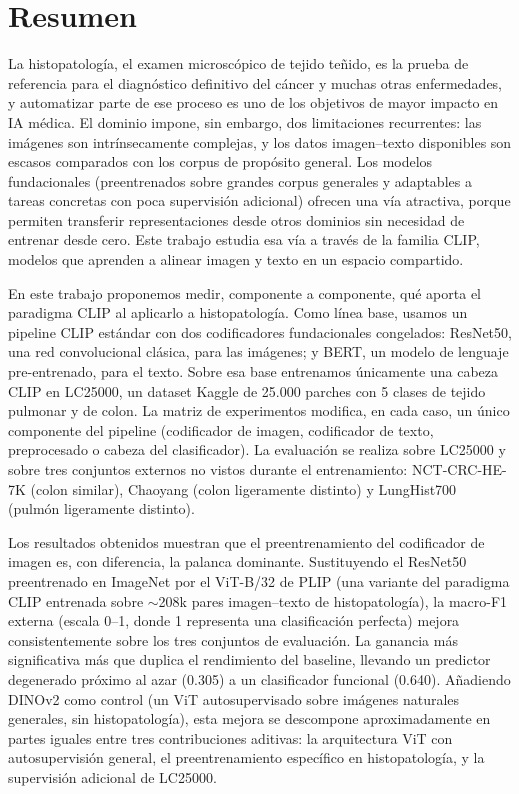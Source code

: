 
\chapter*{Resumen}
\pagestyle{especial}
{}

La histopatología, el examen microscópico de tejido teñido, es la prueba de referencia para el diagnóstico definitivo del cáncer y muchas otras enfermedades, y automatizar parte de ese proceso es uno de los objetivos de mayor impacto en IA médica. El dominio impone, sin embargo, dos limitaciones recurrentes: las imágenes son intrínsecamente complejas, y los datos imagen--texto disponibles son escasos comparados con los corpus de propósito general. Los modelos fundacionales (preentrenados sobre grandes corpus generales y adaptables a tareas concretas con poca supervisión adicional) ofrecen una vía atractiva, porque permiten transferir representaciones desde otros dominios sin necesidad de entrenar desde cero. Este trabajo estudia esa vía a través de la familia CLIP, modelos que aprenden a alinear imagen y texto en un espacio compartido.

En este trabajo proponemos medir, componente a componente, qué aporta el paradigma CLIP al aplicarlo a histopatología. Como línea base, usamos un pipeline CLIP estándar con dos codificadores fundacionales congelados: ResNet50, una red convolucional clásica, para las imágenes; y BERT, un modelo de lenguaje pre-entrenado, para el texto. Sobre esa base entrenamos únicamente una cabeza CLIP en LC25000, un dataset Kaggle de 25.000 parches con 5 clases de tejido pulmonar y de colon. La matriz de experimentos modifica, en cada caso, un único componente del pipeline (codificador de imagen, codificador de texto, preprocesado o cabeza del clasificador). La evaluación se realiza sobre LC25000 y sobre tres conjuntos externos no vistos durante el entrenamiento: NCT-CRC-HE-7K (colon similar), Chaoyang (colon ligeramente distinto) y LungHist700 (pulmón ligeramente distinto).

Los resultados obtenidos muestran que el preentrenamiento del codificador de imagen es, con diferencia, la palanca dominante. Sustituyendo el ResNet50 preentrenado en ImageNet por el ViT-B/32 de PLIP (una variante del paradigma CLIP entrenada sobre $\sim$208k pares imagen--texto de histopatología), la macro-F1 externa (escala 0--1, donde 1 representa una clasificación perfecta) mejora consistentemente sobre los tres conjuntos de evaluación. La ganancia más significativa más que duplica el rendimiento del baseline, llevando un predictor degenerado próximo al azar (0.305) a un clasificador funcional (0.640). Añadiendo DINOv2 como control (un ViT autosupervisado sobre imágenes naturales generales, sin histopatología), esta mejora se descompone aproximadamente en partes iguales entre tres contribuciones aditivas: la arquitectura ViT con autosupervisión general, el preentrenamiento específico en histopatología, y la supervisión adicional de LC25000.


